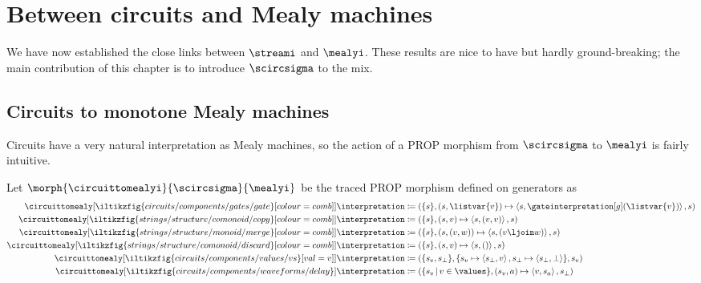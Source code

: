 \section{Between circuits and Mealy machines}

We have now established the close links between \(\streami\) and \(\mealyi\).
These results are nice to have but hardly ground-breaking; the main contribution
of this chapter is to introduce \(\scircsigma\) to the mix.

\subsection{Circuits to monotone Mealy machines}

Circuits have a very natural interpretation as Mealy machines, so the action
of a PROP morphism from \(\scircsigma\) to \(\mealyi\) is fairly intuitive.

\begin{definition}
    Let \(\morph{\circuittomealyi}{\scircsigma}{\mealyi}\) be the traced PROP
    morphism defined on generators as
    \begin{align*}
        \circuittomealy[
            \iltikzfig{circuits/components/gates/gate}[colour=comb]
        ]{\interpretation}
         & \coloneqq \left(
        \{s\},
        \left(s, \listvar{v}\right) \mapsto
        \left\langle{s, \gateinterpretation[g](\listvar{v})}\right\rangle,
        s
        \right)
        \\
        \circuittomealy[
            \iltikzfig{strings/structure/comonoid/copy}[colour=comb]
        ]{\interpretation}
         & \coloneqq \left(
        \{s\},
        (s, v) \mapsto \left\langle{s, (v, v)}\right\rangle,
        s
        \right)
        \\
        \circuittomealy[
            \iltikzfig{strings/structure/monoid/merge}[colour=comb]
        ]{\interpretation}
         & \coloneqq \left(
        \{s\},
        (s, (v, w)) \mapsto
        \left\langle{s, (v \ljoin w)}\right\rangle,
        s
        \right)
        \\
        \circuittomealy[
            \iltikzfig{strings/structure/comonoid/discard}[colour=comb]
        ]{\interpretation}
         & \coloneqq \left(
        \{s\},
        (s, v) \mapsto
        \left\langle{s, ()}\right\rangle,
        s
        \right)
        \\
        \circuittomealy[
            \iltikzfig{circuits/components/values/vs}[val=v]
        ]{\interpretation}
         & \coloneqq
        \left(
        \{s_v, s_\bot\},
        \{
        s_v \mapsto \left\langle{s_\bot,v}\right\rangle,
        s_\bot \mapsto \left\langle{s_\bot,\bot}\right\rangle
        \},
        s_v
        \right)
        \\
        \circuittomealy[
            \iltikzfig{circuits/components/waveforms/delay}
        ]{\interpretation}
         & \coloneqq
        \left(
        \{ s_v \,|\, v \in \values\},
        (s_v, a) \mapsto \left\langle{v,s_a}\right\rangle,
        s_\bot
        \right)
    \end{align*}
\end{definition}

